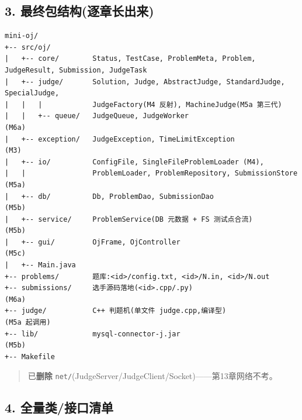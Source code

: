 \documentclass[
  11pt,
]{ctexart}
\begin{document}
\hypertarget{ux6700ux7ec8ux5305ux7ed3ux6784ux9010ux7ae0ux957fux51faux6765}{%
\subsection{3.
最终包结构(逐章长出来)}\label{ux6700ux7ec8ux5305ux7ed3ux6784ux9010ux7ae0ux957fux51faux6765}}

\begin{verbatim}
mini-oj/
+-- src/oj/
|   +-- core/        Status, TestCase, ProblemMeta, Problem, JudgeResult, Submission, JudgeTask
|   +-- judge/       Solution, Judge, AbstractJudge, StandardJudge, SpecialJudge,
|   |   |            JudgeFactory(M4 反射), MachineJudge(M5a 第三代)
|   |   +-- queue/   JudgeQueue, JudgeWorker                              (M6a)
|   +-- exception/   JudgeException, TimeLimitException                   (M3)
|   +-- io/          ConfigFile, SingleFileProblemLoader (M4),
|   |                ProblemLoader, ProblemRepository, SubmissionStore   (M5a)
|   +-- db/          Db, ProblemDao, SubmissionDao                       (M5b)
|   +-- service/     ProblemService(DB 元数据 + FS 测试点合流)           (M5b)
|   +-- gui/         OjFrame, OjController                               (M5c)
|   +-- Main.java
+-- problems/        题库:<id>/config.txt, <id>/N.in, <id>/N.out
+-- submissions/     选手源码落地(<id>.cpp/.py)                          (M6a)
+-- judge/           C++ 判题机(单文件 judge.cpp,编译型)               (M5a 起调用)
+-- lib/             mysql-connector-j.jar                              (M5b)
+-- Makefile
\end{verbatim}

\begin{quote}
已\textbf{删除}
\texttt{net/}(JudgeServer/JudgeClient/Socket)------第13章网络不考。
\end{quote}

\hypertarget{ux5168ux91cfux7c7bux63a5ux53e3ux6e05ux5355}{%
\subsection{4.
全量类/接口清单}\label{ux5168ux91cfux7c7bux63a5ux53e3ux6e05ux5355}}
\end{document}

